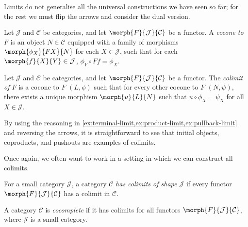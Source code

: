 Limits do not generalise all the universal constructions we have seen so far;
for the rest we must flip the arrows and consider the dual version.

\begin{definition}[Cocone]
    Let \(\mathcal{J}\) and \(\mathcal{C}\) be categories, and let
    \(\morph{F}{\mathcal{J}}{\mathcal{C}}\) be a functor.
    A \emph{cocone to \(F\)} is an object \(N \in \mathcal{C}\) equipped with
    a family of morphisms \(\morph{\phi_X}{FX}{N}\) for each
    \(X \in \mathcal{J}\), such that for each
    \(\morph{f}{X}{Y} \in \mathcal{J}\),
    \(\phi_Y \circ Ff = \phi_X\).
    \begin{center}
        
    \end{center}
\end{definition}

\begin{definition}[Limit]
    Let \(\mathcal{J}\) and \(\mathcal{C}\) be categories, and let
    \(\morph{F}{\mathcal{J}}{\mathcal{C}}\) be a functor.
    The \emph{colimit of \(F\)} is a cocone to \(F\) \((L,\phi)\) such that for
    every other cocone to \(F\) \((N, \psi)\), there exists a unique morphism
    \(\morph{u}{L}{N}\) such that \(u \circ \phi_X = \psi_X\) for all
    \(X \in \mathcal{J}\).
    \begin{center}
        
    \end{center}
\end{definition}

\begin{example}
    By using the reasoning in
    \cref{ex:terminal-limit,ex:product-limit,ex:pullback-limit} and reversing
    the arrows, it is straightforward to see that initial objects, coproducts,
    and pushouts are examples of colimits.
\end{example}

Once again, we often want to work in a setting in which we can construct all
colimits.

\begin{definition}
    For a small category \(\mathcal{J}\), a category \(\mathcal{C}\)
    \emph{has colimits of shape \(\mathcal{J}\)} if every functor
    \(\morph{F}{\mathcal{J}}{\mathcal{C}}\) has a colimit in \(\mathcal{C}\).
\end{definition}

\begin{definition}
    A category \(\mathcal{C}\) is \emph{cocomplete} if it has colimits for all
    functors \(\morph{F}{\mathcal{J}}{\mathcal{C}}\), where \(\mathcal{J}\) is a
    small category.
\end{definition}

